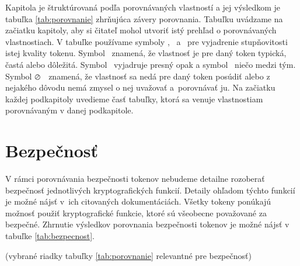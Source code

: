 Kapitola je štruktúrovaná podľa porovnávaných vlastností a jej výsledkom je tabuľka \ref{tab:porovnanie} zhrňujúca závery porovnania. Tabuľku uvádzame na začiatku kapitoly, aby si čitateľ mohol utvoriť istý prehľad o porovnávaných vlastnostiach. V tabuľke používame symboly \CIRCLE, \LEFTcircle ~a \Circle ~pre vyjadrenie stupňovitosti istej kvality tokenu. Symbol \CIRCLE ~znamená, že vlastnosť je pre daný token typická, častá alebo dôležitá. Symbol \Circle ~vyjadruje presný opak a symbol \LEFTcircle ~niečo medzi tým. Symbol $\varoslash$ ~znamená, že vlastnosť sa nedá pre daný token posúdiť alebo z nejakého dôvodu nemá zmysel o nej uvažovať a~porovnávať ju. Na začiatku každej podkapitoly uvedieme časť tabuľky, ktorá sa venuje vlastnostiam porovnávaným v danej podkapitole.

\section{Bezpečnosť}

V rámci porovnávania bezpečnosti tokenov nebudeme detailne rozoberať bezpečnosť jednotlivých kryptografických funkcií. Detaily ohľadom týchto funkcií je možné nájsť v~ich citovaných dokumentáciách. Všetky tokeny ponúkajú možnosť použiť kryptografické funkcie, ktoré sú všeobecne považované za bezpečné. Zhrnutie výsledkov porovnania bezpečnosti tokenov je možné nájsť v tabuľke \ref{tab:bezpecnost}.

\begin{table}[H]
  \begin{center}
    \caption{Bezpečnosť tokenov}(vybrané riadky tabuľky \ref{tab:porovnanie} relevantné pre bezpečnosť)
    \label{tab:bezpecnost} %

  \end{center}
\end{table}

